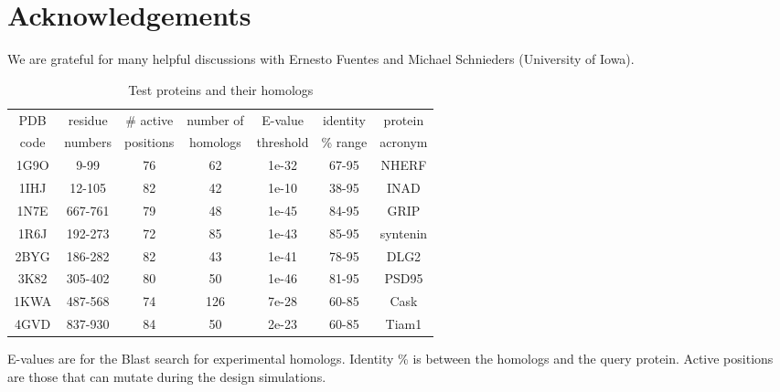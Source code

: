 \documentclass[12pt]{article}
\begin{document}
\section*{Acknowledgements}
We are grateful for many helpful discussions with Ernesto Fuentes and Michael Schnieders (University of Iowa).

\small 


\begin{table}[h]                            
\caption{Test proteins and their homologs} \label{tab:PDZ}                      
\begin{center} 
\begin{tabular}{ccccccc} \hline \hline  
PDB  & residue & \# active & number of & E-value   & identity & protein \\
code & numbers & positions & homologs  & threshold & \% range & acronym \\ \hline
1G9O & 9-99    & 76        & 62        & 1e-32     & 67-95    & NHERF   \\
1IHJ & 12-105  & 82        & 42        & 1e-10     & 38-95    & INAD    \\
1N7E & 667-761 & 79        & 48        & 1e-45     & 84-95    & GRIP    \\
1R6J & 192-273 & 72        & 85        & 1e-43     & 85-95    & syntenin \\
2BYG & 186-282 & 82        & 43        & 1e-41     & 78-95    & DLG2    \\
3K82 & 305-402 & 80        & 50        & 1e-46     & 81-95    & PSD95   \\
1KWA & 487-568 & 74        & 126       & 7e-28     & 60-85    & Cask    \\
4GVD & 837-930 & 84        & 50        & 2e-23     & 60-85    & Tiam1   \\ \hline
\end{tabular}
\end{center}
{\small \noindent E-values are for the Blast search for experimental homologs. Identity \% is between the
homologs and the query protein. Active positions are those that can mutate during the design simulations.
}
\end{table}
\end{document}
